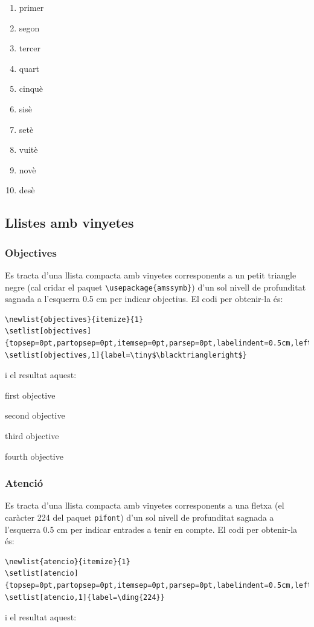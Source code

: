 \documentclass[a4paper,
                             twoside,
                             BCOR1.0cm,
                             DIV11,
                             parskip=full,
                             11pt]{scrbook}
\begin{document}

\begin{enumerate}[nolistsep,label=\ding{\value{enumi}},start=202]
\item  primer
\item segon
\item tercer
\item quart
\item cinquè
\item sisè
\item setè
\item vuitè
\item novè
\item desè
\end{enumerate}

\subsection{Llistes amb vinyetes}\label{sbsec:llistpics}
\subsubsection{Objectives}\label{ssbsec:objs}
Es tracta d'una llista compacta amb vinyetes corresponents a un petit triangle negre (cal cridar el paquet \verb+\usepackage{amssymb}+) d'un sol nivell de profunditat  sagnada a l'esquerra 0.5 cm per indicar objectius. El codi per obtenir-la és:
\begin{tiny}
\begin{verbatim}
\newlist{objectives}{itemize}{1}
\setlist[objectives]{topsep=0pt,partopsep=0pt,itemsep=0pt,parsep=0pt,labelindent=0.5cm,leftmargin=*}
\setlist[objectives,1]{label=\tiny$\blacktriangleright$}
\end{verbatim}
\end{tiny}
i el resultat aquest:

\begin{objectives}
\item  first objective
\item second objective
\item third objective
\item fourth objective
\end{objectives}

\subsubsection{Atenció}\label{ssbsec:at}
Es tracta d'una llista compacta amb vinyetes corresponents a una fletxa (el caràcter 224 del paquet \verb+pifont+) d'un sol nivell de profunditat  sagnada a l'esquerra 0.5 cm per indicar entrades a tenir en compte. El codi per obtenir-la és:
\begin{tiny}
\begin{verbatim}
\newlist{atencio}{itemize}{1}
\setlist[atencio]{topsep=0pt,partopsep=0pt,itemsep=0pt,parsep=0pt,labelindent=0.5cm,leftmargin=*}
\setlist[atencio,1]{label=\ding{224}}
\end{verbatim}
\end{tiny}
i el resultat aquest:
\end{document}
